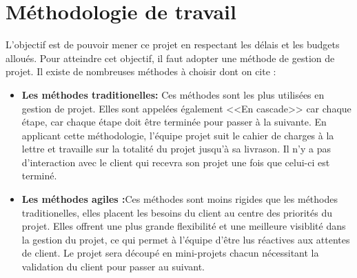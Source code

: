 \section{Méthodologie de travail}
L'objectif est de pouvoir mener ce projet en respectant les délais et les budgets alloués. Pour atteindre cet objectif, il faut adopter une méthode de gestion de projet. Il existe de nombreuses méthodes à choisir dont on cite :
\begin{itemize}
    \item \textbf{Les méthodes traditionelles: }Ces méthodes sont les plus utilisées en gestion de projet. Elles sont appelées également <<En cascade>> car chaque étape, car chaque étape doit être terminée pour passer à la suivante. En applicant cette méthodologie, l'équipe projet suit le cahier de charges à la lettre et travaille sur la totalité du projet jusqu'à sa livrason. Il n'y a pas d'interaction avec le client qui recevra son projet une fois que celui-ci est terminé.
    \item \textbf{Les méthodes agiles :}Ces méthodes sont moins rigides que les méthodes traditionelles, elles placent les besoins du client au centre des priorités du projet. Elles offrent une plus grande flexibilité et une meilleure visiblité dans la gestion du projet, ce qui permet à l'équipe d'être lus réactives aux attentes de client. Le projet sera découpé en mini-projets chacun nécessitant la validation du client pour passer au suivant.
\end{itemize}
